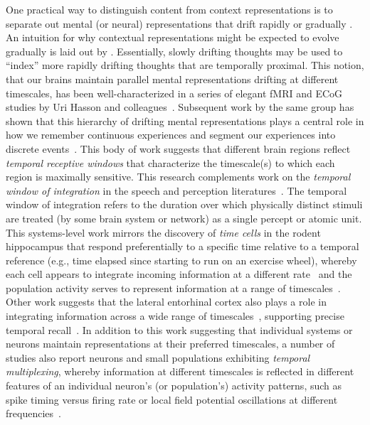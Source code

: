 \documentclass{article}
\begin{document}
One practical way to distinguish content from context representations is to separate out mental (or neural) representations that drift rapidly \citep[content;][]{PolyEtal05a, MannEtal12} or gradually \citep[context;][]{PolyEtal05a, MannEtal11, HowaEtal12, LohnEtal18, LongKaha18, FolkEtal18}.  An intuition for why contextual representations might be expected to evolve gradually is laid out by \cite{PolyKaha08}.  Essentially, slowly drifting thoughts may be used to ``index'' more rapidly drifting thoughts that are temporally proximal.  This notion, that our brains maintain parallel mental representations drifting at different timescales, has been well-characterized in a series of elegant fMRI and ECoG studies by Uri Hasson and colleagues~\citep{HassEtal08, LernEtal11, HoneEtal12a, AlyEtal18}.  Subsequent work by the same group has shown that this hierarchy of drifting mental representations plays a central role in how we remember continuous experiences and segment our experiences into discrete events~\citep{BaldEtal17}.  This body of work suggests that different brain regions reflect \textit{temporal receptive windows} that characterize the timescale(s) to which each region is maximally sensitive.  This research complements work on the \textit{temporal window of integration} in the speech and perception literatures~\citep[e.g.,][]{ViemWake91, GautEtal12, vanWEtal07}.  The temporal window of integration refers to the duration over which physically distinct stimuli are treated (by some brain system or network) as a single percept or atomic unit.  This systems-level work mirrors the discovery of \textit{time cells} in the rodent hippocampus that respond preferentially to a specific time relative to a temporal reference (e.g., time elapsed since starting to run on an exercise wheel), whereby each cell appears to integrate incoming information at a different rate~\citep{PastEtal08, MacDEtal11} and the population activity serves to represent information at a range of timescales~\citep{MauEtal18}. Other work suggests that the lateral entorhinal cortex also plays a role in integrating information across a wide range of timescales~\citep{TsaoEtal18}, supporting precise temporal recall~\citep{MontEtal19}.  In addition to this work suggesting that individual systems or neurons maintain representations at their preferred timescales, a number of studies also report neurons and small populations exhibiting \textit{temporal multiplexing}, whereby information at different timescales is reflected in different features of an individual neuron's (or population's) activity patterns, such as spike timing versus firing rate or local field potential oscillations at different frequencies~\citep{CaruEtal18, KnigEich13, WatrEtal13, PanzEtal10}.
\end{document}
